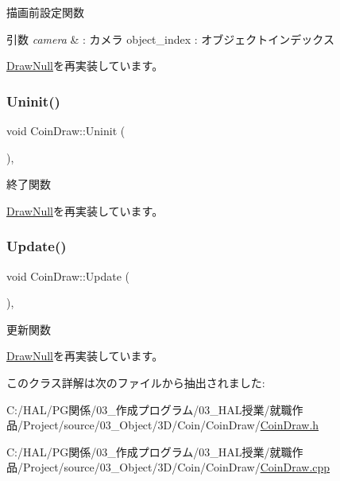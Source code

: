 描画前設定関数 


\begin{DoxyParams}{引数}
{\em camera} & \+: カメラ object\+\_\+index \+: オブジェクトインデックス \\
\hline
\end{DoxyParams}


\mbox{\hyperlink{class_draw_null_a7f0d52c5c2fb2d9b8eb423f363862290}{Draw\+Null}}を再実装しています。

\mbox{\label{class_coin_draw_a6484c22a5598e298f18e7cd6083cd551}} 
\subsubsection{\texorpdfstring{Uninit()}{Uninit()}}
{\footnotesize\ttfamily void Coin\+Draw\+::\+Uninit (\begin{DoxyParamCaption}{ }\end{DoxyParamCaption})\hspace{0.3cm}{\ttfamily [override]}, {\ttfamily [virtual]}}



終了関数 



\mbox{\hyperlink{class_draw_null_a12d44e341c7364b5ab9cdd661dc16187}{Draw\+Null}}を再実装しています。

\mbox{\label{class_coin_draw_a6157b17bf1706b85156aad0d88acfd7e}} 
\subsubsection{\texorpdfstring{Update()}{Update()}}
{\footnotesize\ttfamily void Coin\+Draw\+::\+Update (\begin{DoxyParamCaption}{ }\end{DoxyParamCaption})\hspace{0.3cm}{\ttfamily [override]}, {\ttfamily [virtual]}}



更新関数 



\mbox{\hyperlink{class_draw_null_a0149bcf84a34b138642ab7975ae46f30}{Draw\+Null}}を再実装しています。



このクラス詳解は次のファイルから抽出されました\+:\begin{DoxyCompactItemize}
\item 
C\+:/\+H\+A\+L/\+P\+G関係/03\+\_\+作成プログラム/03\+\_\+\+H\+A\+L授業/就職作品/\+Project/source/03\+\_\+\+Object/3\+D/\+Coin/\+Coin\+Draw/\mbox{\hyperlink{_coin_draw_8h}{Coin\+Draw.\+h}}\item 
C\+:/\+H\+A\+L/\+P\+G関係/03\+\_\+作成プログラム/03\+\_\+\+H\+A\+L授業/就職作品/\+Project/source/03\+\_\+\+Object/3\+D/\+Coin/\+Coin\+Draw/\mbox{\hyperlink{_coin_draw_8cpp}{Coin\+Draw.\+cpp}}\end{DoxyCompactItemize}
